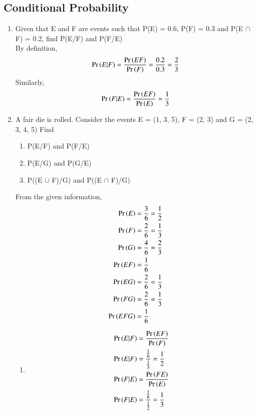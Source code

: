 \subsection{Conditional Probability}
\renewcommand{\theequation}{\theenumi}
\begin{enumerate}[label=\thesubsection.\arabic*.,ref=\thesubsection.\theenumi]

\item Given that E and F are events such that P(E) = 0.6, P(F) = 0.3 and P(E $\cap$ F) = 0.2, find P(E/F) and P(F/E)\\
\solution By definition,
\begin{align}
\Pr\left(E|F\right) = \frac{\Pr\left(EF\right)}{\Pr\left(F\right)} = \frac{0.2}{0.3} = \frac{2}{3}
\end{align}
%
Similarly,
\begin{align}
\Pr\left(F|E\right) = \frac{\Pr\left(EF\right)}{\Pr\left(E\right)} = \frac{1}{3}
\end{align}


\item A fair die is rolled. Consider the events E =  (1, 3, 5), F = (2, 3) and G = (2, 3, 4, 5) Find\\
\begin{enumerate}
\item  P(E/F) and P(F/E) 
\item  P(E/G) and P(G/E)
\item  P((E $\cup$ F)/G) and P((E $\cap$ F)/G)
\end{enumerate}
\solution
%

From the given information,
	\begin{align}
	\Pr\left(E\right) &= \frac{3}{6} = \frac{1}{2} \\
	\Pr\left(F\right) &= \frac{2}{6} = \frac{1}{3} \\	
	\Pr\left(G\right) &= \frac{4}{6} = \frac{2}{3} \\	
	\Pr\left(E F\right) &= \frac{1}{6}\\
	\Pr\left(E G\right) &= \frac{2}{6}= \frac{1}{3}\\
	\Pr\left(F G\right) &= \frac{2}{6}= \frac{1}{3}\\
	\Pr\left(E F G\right) &= \frac{1}{6}
\end{align}
\begin{enumerate}
\item	
\begin{align}
	\Pr\left(E|F\right) &= \frac{\Pr\left(E F\right)}{\Pr\left(F\right)}\\
	\Pr\left(E|F\right) &= \frac{\frac{1}{6}}{\frac{1}{3}} = \frac{1}{2}\\
	\Pr\left(F|E\right) &= \frac{\Pr\left(F E\right)}{\Pr\left(E\right)}\\
	\Pr\left(F|E\right) &= \frac{\frac{1}{6}}{\frac{1}{2}} = \frac{1}{3}
	\end{align}


\end{enumerate}
\end{enumerate}

